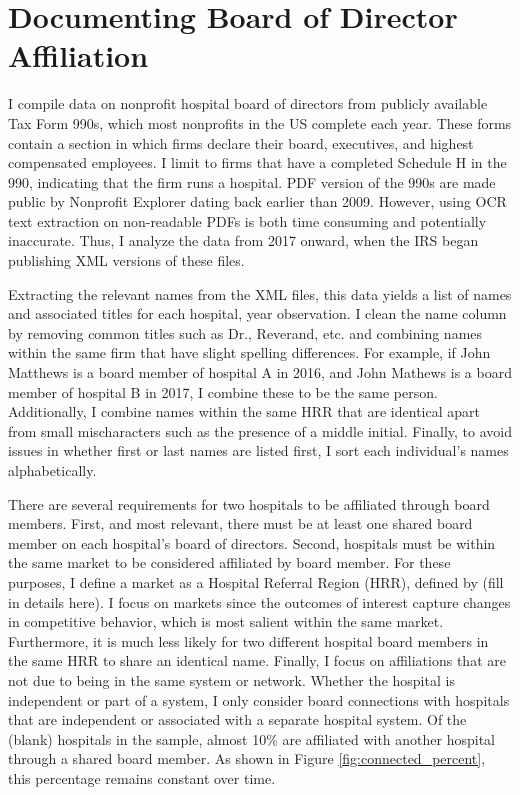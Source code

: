 \documentclass[12pt]{article}
\begin{document}
    \section{Documenting Board of Director Affiliation}

    I compile data on nonprofit hospital board of directors from publicly available Tax Form 990s, which most nonprofits in the US complete each year. These forms contain a section in which firms declare their board, executives, and highest compensated employees. I limit to firms that have a completed Schedule H in the 990, indicating that the firm runs a hospital. PDF version of the 990s are made public by Nonprofit Explorer dating back earlier than 2009. However, using OCR text extraction on non-readable PDFs is both time consuming and potentially inaccurate. Thus, I analyze the data from 2017 onward, when the IRS began publishing XML versions of these files. 

    Extracting the relevant names from the XML files, this data yields a list of names and associated titles for each hospital, year observation. I clean the name column by removing common titles such as Dr., Reverand, etc. and combining names within the same firm that have slight spelling differences. For example, if John Matthews is a board member of hospital A in 2016, and John Mathews is a board member of hospital B in 2017, I combine these to be the same person. Additionally, I combine names within the same HRR that are identical apart from small mischaracters such as the presence of a middle initial. Finally, to avoid issues in whether first or last names are listed first, I sort each individual's names alphabetically. 

    There are several requirements for two hospitals to be affiliated through board members. First, and most relevant, there must be at least one shared board member on each hospital's board of directors. Second, hospitals must be within the same market to be considered affiliated by board member. For these purposes, I define a market as a Hospital Referral Region (HRR), defined by (fill in details here). I focus on markets since the outcomes of interest capture changes in competitive behavior, which is most salient within the same market. Furthermore, it is much less likely for two different hospital board members in the same HRR to share an identical name. Finally, I focus on affiliations that are not due to being in the same system or network. Whether the hospital is independent or part of a system, I only consider board connections with hospitals that are independent or associated with a separate hospital system. Of the (blank) hospitals in the sample, almost 10\% are affiliated with another hospital through a shared board member. As shown in Figure \ref{fig:connected_percent}, this percentage remains constant over time. 
\end{document}
